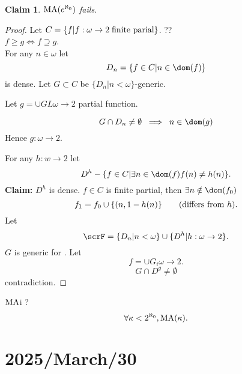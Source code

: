 \documentclass[11pt,pdftex,twoside,a4paper]{article}
\newcommand{\B}[1]{\textbf{#1}}
\newcommand{\MA}{\ensuremath{\mathop{\rm MA}\nolimits}}
\newtheorem{claim}[thm]{Claim}
\theoremstyle{definition}
\begin{document}
\begin{claim}
\(\MA(e^{\aleph_0})\) fails.
\end{claim}
\begin{proof}
Let \(C = \{f| f: \omega \to 2 \;\textnormal{finite parial}\}\). ??
\\
\(f \geq g \iff f \supseteq g\).
\\
For any \(n\in \omega\) let
\begin{equation*}
D_n = \{f\in C| n \in\dom(f)\}
\end{equation*}
is dense.
Let \(G \subset C\)  be  \(\{D_n|n < \omega\}\)-generic.

Let \(g = \cup GL \omega \to 2\) partial function.

\begin{equation*}
 G \cap D_n \neq \emptyset \;\implies\; n \in \dom(g)
\end{equation*}
Hence  \(g:\omega \to 2\).

For any \(h:w\to 2\) let
\begin{equation*}
D^h - \{f\in C| \exists n\in \dom(f) f(n)\neq h(n)\}.
\end{equation*}
\B{Claim:} \(D^h\) is dense.
\(f\in C\) is finite partial, then \(\exists n \notin \dom(f_0)\)
\begin{equation*}
f_1 = f_0 \cup \{(n,1 - h(n)\} \qquad \textnormal{(differs from $h$)}.
\end{equation*}
Let
\begin{equation*}
\scrF = \{D_n | n < \omega\} \cup \{D^h | h : \omega \to 2\}.
\end{equation*}
$G$ is generic for \scrF.
Let
\begin{equation*}
f = \cup G_i \omega \to 2.
\end{equation*}
\begin{equation*}
 G \cap D^g \neq \emptyset
\end{equation*}
contradiction.
\end{proof}

\(\MA\)i ?
\begin{equation*}
\forall \kappa < 2^{\aleph_0}, \MA(\kappa).
\end{equation*}

\section{2025/March/30}
\end{document}
